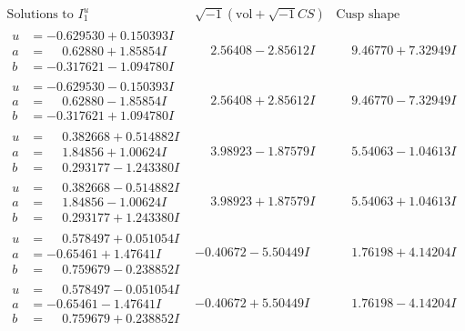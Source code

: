 \documentclass[1p]{elsarticle_modified}
\theoremstyle{definition}
\newcommand{\I}{\sqrt{-1}}
\begin{document}
$$\begin{array}{c|c|c}
\text{Solutions to }I^u_{1}& \I (\text{vol} + \sqrt{-1}CS) & \text{Cusp shape}\\
 \hline 
\begin{aligned}
u &= -0.629530 + 0.150393 I \\
a &= \phantom{-}0.62880 + 1.85854 I \\
b &= -0.317621 - 1.094780 I\end{aligned}
 & \phantom{-}2.56408 - 2.85612 I & \phantom{-}9.46770 + 7.32949 I \\ \hline\begin{aligned}
u &= -0.629530 - 0.150393 I \\
a &= \phantom{-}0.62880 - 1.85854 I \\
b &= -0.317621 + 1.094780 I\end{aligned}
 & \phantom{-}2.56408 + 2.85612 I & \phantom{-}9.46770 - 7.32949 I \\ \hline\begin{aligned}
u &= \phantom{-}0.382668 + 0.514882 I \\
a &= \phantom{-}1.84856 + 1.00624 I \\
b &= \phantom{-}0.293177 - 1.243380 I\end{aligned}
 & \phantom{-}3.98923 - 1.87579 I & \phantom{-}5.54063 - 1.04613 I \\ \hline\begin{aligned}
u &= \phantom{-}0.382668 - 0.514882 I \\
a &= \phantom{-}1.84856 - 1.00624 I \\
b &= \phantom{-}0.293177 + 1.243380 I\end{aligned}
 & \phantom{-}3.98923 + 1.87579 I & \phantom{-}5.54063 + 1.04613 I \\ \hline\begin{aligned}
u &= \phantom{-}0.578497 + 0.051054 I \\
a &= -0.65461 + 1.47641 I \\
b &= \phantom{-}0.759679 - 0.238852 I\end{aligned}
 & -0.40672 - 5.50449 I & \phantom{-}1.76198 + 4.14204 I \\ \hline\begin{aligned}
u &= \phantom{-}0.578497 - 0.051054 I \\
a &= -0.65461 - 1.47641 I \\
b &= \phantom{-}0.759679 + 0.238852 I\end{aligned}
 & -0.40672 + 5.50449 I & \phantom{-}1.76198 - 4.14204 I \\ \hline\begin{aligned}

\end{aligned}
\end{array}$$
\end{document}
